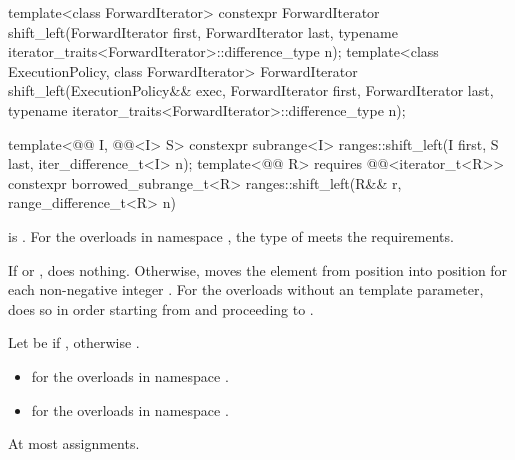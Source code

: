 %
\begin{itemdecl}
template<class ForwardIterator>
  constexpr ForwardIterator
    shift_left(ForwardIterator first, ForwardIterator last,
               typename iterator_traits<ForwardIterator>::difference_type n);
template<class ExecutionPolicy, class ForwardIterator>
  ForwardIterator
    shift_left(ExecutionPolicy&& exec, ForwardIterator first, ForwardIterator last,
               typename iterator_traits<ForwardIterator>::difference_type n);

template<@@ I, @@<I> S>
  constexpr subrange<I> ranges::shift_left(I first, S last, iter_difference_t<I> n);
template<@@ R>
  requires @@<iterator_t<R>>
  constexpr borrowed_subrange_t<R> ranges::shift_left(R&& r, range_difference_t<R> n)
\end{itemdecl}

\begin{itemdescr}
\pnum
\expects
{} is .
For the overloads in namespace ,
the type of  meets the  requirements.

\pnum
\effects
If  or , does nothing.
Otherwise, moves the element
from position 
into position 
for each non-negative integer .
For the overloads without an  template parameter,
does so in order starting
from  and proceeding to .

\pnum
\returns
Let  be 
if ,
otherwise .
\begin{itemize}
\item
{} for the overloads in namespace .
\item
{}
for the overloads in namespace .
\end{itemize}

\pnum
\complexity
At most  assignments.
\end{itemdescr}

